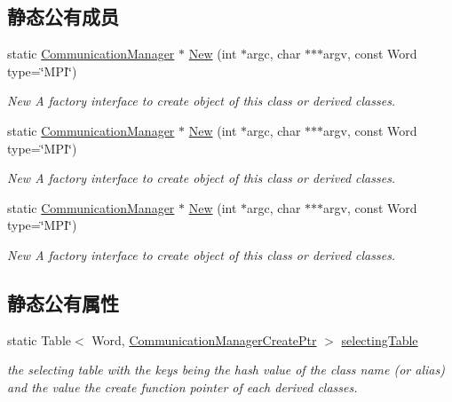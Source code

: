 \subsection*{静态公有成员}
\begin{DoxyCompactItemize}
\item 
static \hyperlink{classHSF_1_1CommunicationManager}{CommunicationManager} $\ast$ \hyperlink{classHSF_1_1CommunicationManager_a4ab7d9f97d7fe999a6b8173af7ff0dd7}{New} (int $\ast$argc, char $\ast$$\ast$$\ast$argv, const Word type=\char`\"{}MPI\char`\"{})
\begin{DoxyCompactList}\small\item\em New A factory interface to create object of this class or derived classes. \item\end{DoxyCompactList}\item 
static \hyperlink{classHSF_1_1CommunicationManager}{CommunicationManager} $\ast$ \hyperlink{classHSF_1_1CommunicationManager_a4ab7d9f97d7fe999a6b8173af7ff0dd7}{New} (int $\ast$argc, char $\ast$$\ast$$\ast$argv, const Word type=\char`\"{}MPI\char`\"{})
\begin{DoxyCompactList}\small\item\em New A factory interface to create object of this class or derived classes. \item\end{DoxyCompactList}\item 
static \hyperlink{classHSF_1_1CommunicationManager}{CommunicationManager} $\ast$ \hyperlink{classHSF_1_1CommunicationManager_a4ab7d9f97d7fe999a6b8173af7ff0dd7}{New} (int $\ast$argc, char $\ast$$\ast$$\ast$argv, const Word type=\char`\"{}MPI\char`\"{})
\begin{DoxyCompactList}\small\item\em New A factory interface to create object of this class or derived classes. \item\end{DoxyCompactList}\end{DoxyCompactItemize}
\subsection*{静态公有属性}
\begin{DoxyCompactItemize}
\item 
static Table$<$ Word, \hyperlink{classHSF_1_1CommunicationManager_a11ce3f8f0c5cf854ecc7a77313c7ae2d}{CommunicationManagerCreatePtr} $>$ \hyperlink{classHSF_1_1CommunicationManager_a8134bb28ff180acd3f7b58f00a1ae3fa}{selectingTable}
\begin{DoxyCompactList}\small\item\em the selecting table with the keys being the hash value of the class name (or alias) and the value the create function pointer of each derived classes. \item\end{DoxyCompactList}\end{DoxyCompactItemize}


